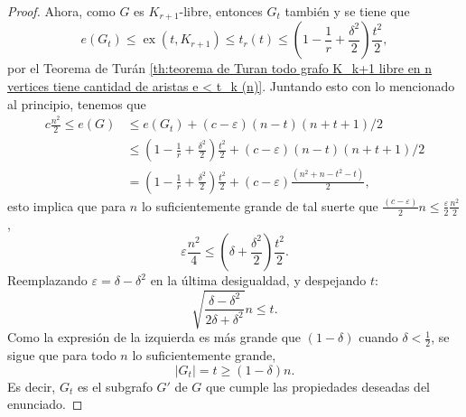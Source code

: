 \documentclass[12pt]{report}
\theoremstyle{plain}
\theoremstyle{definition}
\newcommand{\abs}[1]{\left \vert #1 \right \vert}
\newcommand{\ex}[2]{\operatorname{ex} (#1, #2)}
\begin{document}
\begin{proof}
Ahora, como $G$ es $K_{r+1}$-libre, entonces $G_t$ también y se tiene que
\[
    e(G_t) \leq \ex t {K_{r+1}} \leq t_r (t) \leq \left (1 - \frac 1 r + \frac{\delta^2}{2} \right) \frac{t^2}{2},
\]
por el Teorema de Turán \ref{th:teorema de Turan todo grafo K_k+1 libre en n vertices tiene cantidad de aristas e < t_k (n)}. Juntando esto con lo mencionado al principio, tenemos que
\begin{align*}
    c \frac{n^2}{2} \leq e(G) &\leq e (G_t) + (c- \varepsilon) (n-t) (n+t+1)/2 \\
    &\leq \left (1 - \frac 1 r + \frac{ \delta^2}2 \right) \frac{t^2}{2} + (c- \varepsilon) (n-t) (n+t+1)/2 \\
    &= \left (1 - \frac 1 r + \frac{ \delta^2}2 \right) \frac{t^2}{2} + (c- \varepsilon) \frac{(n^2 + n - t^2 - t)}{2},
\end{align*}
esto implica que para $n$ lo suficientemente grande de tal suerte que $\frac{(c - \varepsilon)}{2} n \leq \frac{\varepsilon }{2} \frac{n^2}{2}$,
\[
    \varepsilon \frac{n^2}{4}  \leq (\delta + \frac{\delta^2}{2}) \frac{t^2}{2}.
\]
Reemplazando $\varepsilon = \delta - \delta^2$ en la última desigualdad, y despejando $t$:
\[
    \sqrt{\frac{\delta - \delta^2}{2 \delta + \delta^2}} n \leq t.
\]
Como la expresión de la izquierda es más grande que $(1 - \delta)$ cuando $\delta < \frac 1 2$, se sigue que para todo $n$ lo suficientemente grande,
\[
    \abs {G_t}  = t \geq (1 - \delta) n.
\]
Es decir, $G_t$ es el subgrafo $G'$ de $G$ que cumple las propiedades deseadas del enunciado.
\end{proof}
\end{document}
